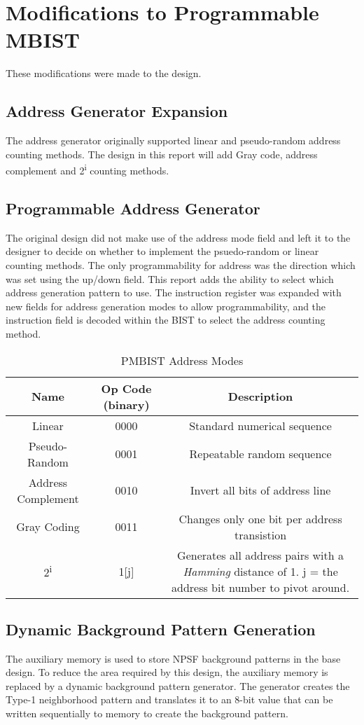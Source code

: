\section{Modifications to Programmable MBIST}
\label{sect:bg-modifications}
These modifications were made to the design.

\subsection{Address Generator Expansion}
The address generator originally supported linear and pseudo-random address counting methods.  The design in this report will add Gray code, address complement and 2\textsuperscript{i} counting methods.

\subsection{Programmable Address Generator}
The original design did not make use of the address mode field and left it to the designer to decide on whether to implement the psuedo-random or linear counting methods.  The only programmability for address was the direction which was set using the up/down field.  This report adds the ability to select which address generation pattern to use.  The instruction register was expanded with new fields for address generation modes to allow programmability, and the instruction field is decoded within the BIST to select the address counting method.

\begin{table}[h]
  \caption{PMBIST Address Modes}
  \centering
  \begin{tabular}{c c c}
  \hline\hline
  Name & Op Code (binary) & Description \\ [0.5ex]
  \hline
  Linear              & 0000 & Standard numerical sequence  \\
  Pseudo-Random       & 0001 & Repeatable random sequence \\
  Address Complement  & 0010 & Invert all bits of address line \\
  Gray Coding         & 0011 & Changes only one bit per address transistion \\
  2\textsuperscript{i}& 1[j] & Generates all address pairs with a \textit{Hamming} distance of 1.  j = the address bit number to pivot around. \\
  \hline\hline
  \end{tabular}
\label{tab:addrmode}
\end{table}

\subsection{Dynamic Background Pattern Generation}
The auxiliary memory is used to store NPSF background patterns in the base design.  To reduce the area required by this design, the auxiliary memory is replaced by a dynamic background pattern generator.  The generator creates the Type-1 neighborhood pattern and translates it to an 8-bit value that can be written sequentially to memory to create the background pattern.


